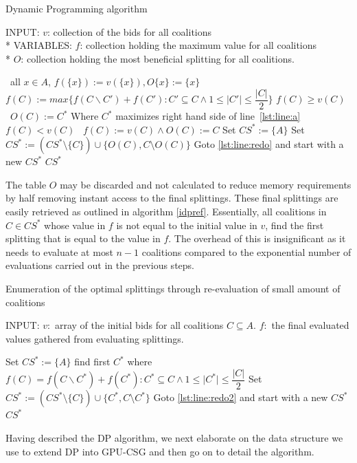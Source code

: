 \documentclass{llncs}
\begin{document}
\begin{algorithm}
\caption{Dynamic Programming algorithm \label{DP}}
INPUT: $v$: collection of the bids for all coalitions\\*
VARIABLES: $f$: collection holding the maximum value for all coalitions\\*
$O$: collection holding the most beneficial splitting for all coalitions.
\begin{algorithmic}[1]
\STATE\algorithmicfor\ all $x \in A$, \algorithmicdo  $f(\{x\}):= v(\{x\}),O\{x\}:= \{x\}$ \algorithmicendfor
{}
\STATE $f(C) := max\{f(C\backslash C')+f(C'):C'\subseteq C \wedge 1 \leq \vert C' \vert \leq \dfrac{\vert C \vert}{2}\}$ \label{lst:line:a}
\STATE\algorithmicif $f(C) \geq v(C)$ \algorithmicthen\ $O(C) := C^{*}$ \hfill Where $C^{*}$ maximizes right hand side of line~\ref{lst:line:a} \algorithmicendif
\STATE\algorithmicif $f(C) < v(C)$ \algorithmicthen\ $f(C) := v(C)\wedge O(C) := C$ \algorithmicendif
\ENDFOR
\ENDFOR
\STATE Set $CS^* := \{A\}$
 \label{lst:line:redo}
\STATE Set $CS^* := (CS^*\setminus \{C\})\cup \{O(C),C\setminus O(C)\}$ 
\STATE Goto \ref{lst:line:redo} and start with a new $CS^*$
\ENDIF
\ENDFOR
\RETURN $CS^*$
\end{algorithmic}
\end{algorithm}

The table $O$ may be discarded and not calculated to reduce memory requirements by half removing instant access to the final splittings. These final splittings are easily retrieved as outlined in algorithm \ref{idpref}.  Essentially, all coalitions in $C \in CS^*$ whose value in $f$ is not equal to the initial value in $v$, find the first splitting that is equal to the value in $f$. The overhead of this is insignificant as it needs to evaluate at most $n -1$ coalitions compared to the exponential
number of evaluations carried out in the previous steps\cite{eps265062}.

\begin{algorithm}
\caption{Enumeration of the optimal splittings through re-evaluation of small amount of coalitions \label{idpref}}
INPUT: $v:$ array of the initial bids for all coalitions $C \subseteq A$. 
$f:$ the final evaluated values gathered from evaluating splittings.
\begin{algorithmic}[1]
\STATE Set $CS^* := \{A\}$
 \label{lst:line:redo2}
\STATE find first $C^*$ where $f(C) = f(C\backslash C^*)+f(C^*):C^*\subseteq C \wedge 1 \leq \vert C^* \vert \leq \dfrac{\vert C \vert}{2}$ \label{lst:line:aa}
\STATE Set $CS^* := (CS^*\setminus \{C\})\cup \{C^*,C\setminus C^*\}$
\STATE Goto \ref{lst:line:redo2} and start with a new $CS^*$
\ENDIF
\ENDFOR
\RETURN $CS^*$
\end{algorithmic}
\end{algorithm}
Having described the DP algorithm, we next elaborate on the data structure we use to extend DP into GPU-CSG and then go on to detail the algorithm.
\end{document}
